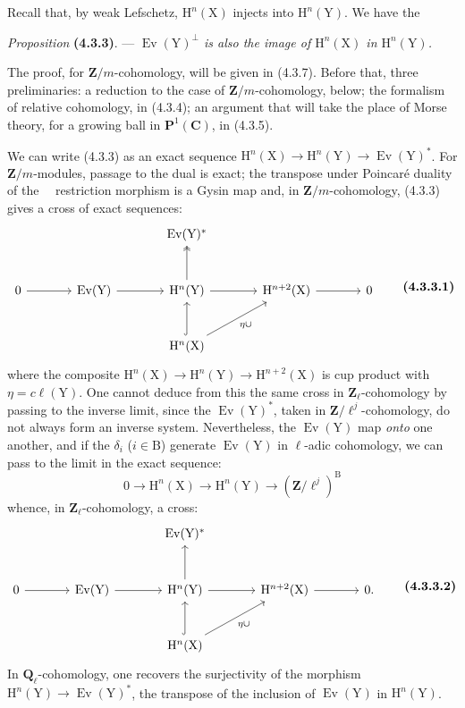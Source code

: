 \documentclass[11pt,leqno]{article}
\newcommand{\Page}[1]{\ifvmode\noindent\else\unskip\ \fi{\footnotesize\textcolor{gray}{[p.\,#1]}}\ \ignorespaces}
\begin{document}
Recall that, by weak Lefschetz, \(\mathrm{H}^n(\mathrm{X})\) injects into \(\mathrm{H}^n(\mathrm{Y})\). We have the

\textit{Proposition} \textbf{(4.3.3)}. — \textit{\(\operatorname{Ev}(\mathrm{Y})^\perp\) is also the image of \(\mathrm{H}^n(\mathrm{X})\) in \(\mathrm{H}^n(\mathrm{Y})\).}

The proof, for \(\mathbf{Z}/m\)-cohomology, will be given in (4.3.7). Before that, three preliminaries: a reduction to the case of \(\mathbf{Z}/m\)-cohomology, below; the formalism of relative cohomology, in (4.3.4); an argument that will take the place of Morse theory, for a growing ball in \(\mathbf{P}^1(\mathbf{C})\), in (4.3.5).

We can write (4.3.3) as an exact sequence \(\mathrm{H}^n(\mathrm{X})\to\mathrm{H}^n(\mathrm{Y})\to\operatorname{Ev}(\mathrm{Y})^*\). For \(\mathbf{Z}/m\)-modules, passage to the dual is exact; the transpose under Poincaré duality of the
\Page{223}restriction morphism is a Gysin map and, in \(\mathbf{Z}/m\)-cohomology, (4.3.3) gives a cross of exact sequences:
\[
\begin{tikzcd}[column sep=large,row sep=large]
{} & {} & \operatorname{Ev}(\mathrm{Y})^* & {} & {} \\
0 \arrow[r]
  & \operatorname{Ev}(\mathrm{Y}) \arrow[r]
  & \mathrm{H}^n(\mathrm{Y}) \arrow[r] \arrow[u,two heads]
  & \mathrm{H}^{n+2}(\mathrm{X}) \arrow[r]
  & 0 \\
{} & {}
  & \mathrm{H}^n(\mathrm{X}) \arrow[u,hook] \arrow[ur,"\eta\cup"']
  & {} & {}
\end{tikzcd}
\tag*{\textbf{(4.3.3.1)}}
\]
where the composite \(\mathrm{H}^n(\mathrm{X})\to\mathrm{H}^n(\mathrm{Y})\to\mathrm{H}^{n+2}(\mathrm{X})\) is cup product with \(\eta=c\ell(\mathrm{Y})\). One cannot deduce from this the same cross in \(\mathbf{Z}_\ell\)-cohomology by passing to the inverse limit, since the \(\operatorname{Ev}(\mathrm{Y})^*\), taken in \(\mathbf{Z}/\ell^j\)-cohomology, do not always form an inverse system. Nevertheless, the \(\operatorname{Ev}(\mathrm{Y})\) map \textit{onto} one another, and if the \(\delta_i\) (\(i\in\mathrm{B}\)) generate \(\operatorname{Ev}(\mathrm{Y})\) in \(\ell\)-adic cohomology, we can pass to the limit in the exact sequence:
\[
0\to\mathrm{H}^n(\mathrm{X})
\to\mathrm{H}^n(\mathrm{Y})
\to(\mathbf{Z}/\ell^j)^{\mathrm{B}}
\]
whence, in \(\mathbf{Z}_\ell\)-cohomology, a cross:
\[
\begin{tikzcd}[column sep=large,row sep=large]
{} & {} & \operatorname{Ev}(\mathrm{Y})^* & {} & {} \\
0 \arrow[r]
  & \operatorname{Ev}(\mathrm{Y}) \arrow[r]
  & \mathrm{H}^n(\mathrm{Y}) \arrow[r] \arrow[u]
  & \mathrm{H}^{n+2}(\mathrm{X}) \arrow[r]
  & 0. \\
{} & {}
  & \mathrm{H}^n(\mathrm{X}) \arrow[u,hook] \arrow[ur,"\eta\cup"']
  & {} & {}
\end{tikzcd}
\tag*{\textbf{(4.3.3.2)}}
\]
In \(\mathbf{Q}_\ell\)-cohomology, one recovers the surjectivity of the morphism \(\mathrm{H}^n(\mathrm{Y})\to\operatorname{Ev}(\mathrm{Y})^*\), the transpose of the inclusion of \(\operatorname{Ev}(\mathrm{Y})\) in \(\mathrm{H}^n(\mathrm{Y})\).
\end{document}
